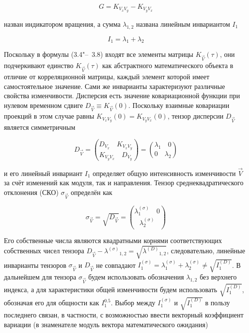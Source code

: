 \begin{equation}
\label{eq:equation3_7}
G=K_{{V_{x}V_{y}}}-K_{{V_{y}V_{x}}}
\end{equation} 

назван индикатором вращения, а сумма $\lambda_{1,2}$ названа линейным инвариантом $I_1$ 

\begin{equation}
\label{eq:equation3_8}
I_1=\lambda_{1}+\lambda_{2}
\end{equation}

Поскольку в формулы (3.4"--~3.8) входят все элементы матрицы $K_{\vec{V}}(\tau)$, они подчеркивают единство $K_{\vec{V}}(\tau)$ как абстрактного математического объекта в отличие от корреляционной матрицы, каждый элемент которой имеет самостоятельное значение. Сами же инварианты характеризуют различные свойства изменчивости.
Дисперсия есть значение ковариационной функции при нулевом временном сдвиге $D_{\vec{V}}\equiv{K_{\vec{V}}(0)}$. Поскольку взаимные ковариации проекций в этом случае равны ${K_{{V_{x}V_{y}}}(0)={K_{{V_{y}V_{x}}}(0)}}$, тензор дисперсии $D_{\vec{V}}$ является симметричным
		
\begin{equation}
\label{eq:equation3_9}
D_{\vec{V}} = {{{D_{V_{x}}\quad K_{V_{x}V_{y}}}\choose {K_{V_{y}V_{x}}\quad D_{V_{y}}}} = {{\lambda_1}\quad 0 \choose 0 \quad {\lambda_2}}}
\end{equation}	
		
и его линейный инвариант $I_1$ определяет общую интенсивность изменчивости $\vec{V}$ за счёт изменений как модуля, так и направления. 
Тензор среднеквадратического отклонения (СКО) $\sigma_{\vec{V}}$ определён как 
		
\begin{equation}
\label{eq:equation3_10}
\sigma_{\vec{V}} = \sqrt{D_{\vec{V}}} = {{\lambda^{(\sigma)}_1 \quad 0}\choose {\lambda^{(\sigma)}_2}}
\end{equation}
		
Его собственные числа являются квадратными корнями соответствующих собственных чисел тензора $D_{\vec{V}}-{{\lambda^{(\sigma)}}_{1,2}}={\sqrt{{\lambda^{(D)}}_{1,2}}}$, следовательно, линейные инварианты тензоров $\sigma_{\vec{V}}$ и $D_{\vec{V}}$ не совпадают ${I^{(\sigma)}_1}={{\lambda^{(\sigma)}_1}+{\lambda^{(\sigma)}_2}\neq{\sqrt{I^{(D)}_1}}}$. В дальнейшем для тензора $\sigma_{\vec{V}}$ будем использовать обозначения $\lambda_{1,2}$ без верхнего индекса, а для характеристики общей изменчивости будем использовать $\sqrt{I^{(D)}_1}$, обозначая его для общности как $I^{0.5}_1$. Выбор между $I^{(\sigma)}_1$ и $\sqrt{I^{(D)}_1}$ в пользу последнего связан, в частности, с возможностью ввести векторный коэффициент вариации (в знаменателе модуль вектора математического ожидания)
		
